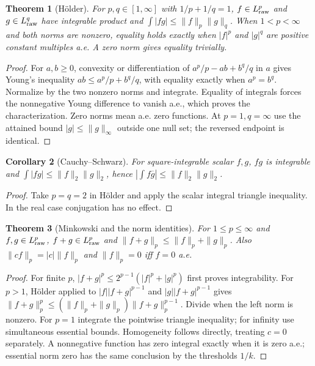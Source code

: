 \documentclass[11pt,oneside,openany]{book}
\newtheorem{theorem}{Theorem}[chapter]
\newtheorem{corollary}[theorem]{Corollary}
\theoremstyle{definition}
\theoremstyle{remark}
\newcommand{\family}[1]{}
\begin{document}
\begin{theorem}[H\"older]\family{D11.10.holder}\label{d11:10:holder}
For $p,q\in[1,\infty]$ with $1/p+1/q=1$, $f\in L^p_{\rm raw}$ and
$g\in L^q_{\rm raw}$ have integrable product and
$\int|fg|\leq\|f\|_p\|g\|_q$. When $1<p<\infty$ and both norms are
nonzero, equality holds exactly when $|f|^p$ and $|g|^q$ are positive
constant multiples a.e. A zero norm gives equality trivially.
\end{theorem}
\begin{proof}
For $a,b\geq0$, convexity or differentiation of
$a^p/p-ab+b^q/q$ in $a$ gives Young's inequality
$ab\leq a^p/p+b^q/q$, with equality exactly when $a^p=b^q$.
Normalize by the two nonzero norms and integrate. Equality of integrals
forces the nonnegative Young difference to vanish a.e., which proves the
characterization. Zero norms mean a.e. zero functions. At $p=1,q=\infty$
use the attained bound $|g|\leq\|g\|_\infty$ outside one null set;
the reversed endpoint is identical.
\end{proof}

\begin{corollary}[Cauchy--Schwarz]\family{D11.10.cauchy_schwarz}\label{d11:10:cauchy-schwarz}
For square-integrable scalar $f,g$, $fg$ is integrable and
$\int|fg|\leq\|f\|_2\|g\|_2$, hence
$|\int f\overline g|\leq\|f\|_2\|g\|_2$.
\end{corollary}
\begin{proof}
Take $p=q=2$ in H\"older and apply the scalar integral triangle inequality.
In the real case conjugation has no effect.
\end{proof}

\begin{theorem}[Minkowski and the norm identities]\family{D11.10.minkowski}\label{d11:10:minkowski}
For $1\leq p\leq\infty$ and $f,g\in L^p_{\rm raw}$,
$f+g\in L^p_{\rm raw}$ and $\|f+g\|_p\leq\|f\|_p+\|g\|_p$.
Also $\|cf\|_p=|c|\|f\|_p$ and $\|f\|_p=0$ iff $f=0$ a.e.
\end{theorem}
\begin{proof}
For finite $p$, $|f+g|^p\leq2^{p-1}(|f|^p+|g|^p)$ first proves
integrability. For $p>1$, H\"older applied to
$|f||f+g|^{p-1}$ and $|g||f+g|^{p-1}$ gives
$\|f+g\|_p^p\leq(\|f\|_p+\|g\|_p)\|f+g\|_p^{p-1}$.
Divide when the left norm is nonzero. For $p=1$ integrate the pointwise
triangle inequality; for infinity use simultaneous essential bounds.
Homogeneity follows directly, treating $c=0$ separately. A nonnegative
function has zero integral exactly when it is zero a.e.; essential norm zero
has the same conclusion by the thresholds $1/k$.
\end{proof}
\end{document}
